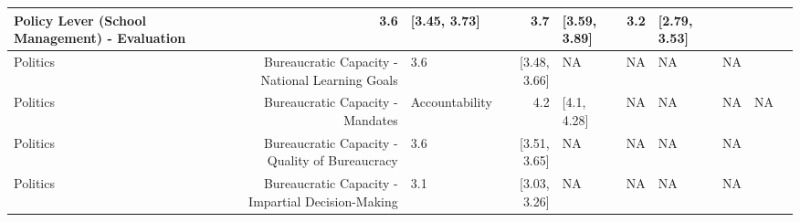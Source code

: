 \documentclass[
]{article}
\begin{document}
\begin{table}
\begin{tabular}[t]{l|r|l|r|l|r|l|l}
\hline
Policy Lever (School Management) - Evaluation & 3.6 & [3.45, 3.73] & 3.7 & [3.59, 3.89] & 3.2 & [2.79, 3.53] & \\
\hline
Politics & Bureaucratic Capacity - National Learning Goals & 3.6 & [3.48, 3.66] & NA & NA & NA & NA & \\
\hline
Politics & Bureaucratic Capacity - Mandates & Accountability & 4.2 & [4.1, 4.28] & NA & NA & NA & NA & \\
\hline
Politics & Bureaucratic Capacity - Quality of Bureaucracy & 3.6 & [3.51, 3.65] & NA & NA & NA & NA & \\
\hline
Politics & Bureaucratic Capacity - Impartial Decision-Making & 3.1 & [3.03, 3.26] & NA & NA & NA & NA & \\
\hline
\end{tabular}
\end{table}
\end{document}

